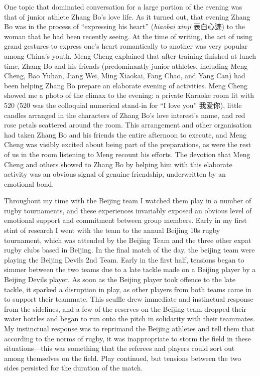 \begin{CJK}{UTF8}{gbsn}
One topic that dominated conversation for a large portion of the evening was that of junior athlete Zhang Bo's love life.  As it turned out, that evening Zhang Bo was in the process of ``expressing his heart'' (\textit{biaobai xinji} 表白心迹) to the woman that he had been recently seeing.  At the time of writing, the act of using grand gestures to express one's heart romantically to another was very popular among China's youth.  Meng Cheng explained that after training finished at lunch time, Zhang Bo and his friends (predominantly junior athletes, including Meng Cheng, Bao Yuhan, Jiang Wei, Ming Xiaokai, Fang Chao, and Yang Can) had been helping Zhang Bo prepare an elaborate evening of activities.  Meng Cheng showed me a photo of the climax to the evening: a private Karaoke room lit with 520 (520 was the colloquial numerical stand-in for ``I love you'' 我爱你), little candles arranged in the characters of Zhang Bo's love interest's name, and red rose petals scattered around the room.  This arrangement and other organisation had taken Zhang Bo and his friends the entire afternoon to execute, and Meng Cheng was visibly excited about being part of the preparations, as were the rest of us in the room listening to Meng recount his efforts.   The devotion that Meng Cheng and others showed to Zhang Bo by helping him with this elaborate activity was an obvious signal of genuine friendship, underwritten by an emotional bond.

Throughout my time with the Beijing team I watched them play in a number of rugby tournaments, and these experiences invariably exposed an obvious level of emotional support and commitment between group members.  Early in my first stint of research I went with the team to the annual Beijing 10s rugby tournament, which was attended by the Beijing Team and the three other expat rugby clubs based in Beijing.  In the final match of the day, the beijing team were playing the Beijing Devils 2nd Team.  Early in the first half, tensions began to simmer between the two teams due to a late tackle made on a Beijing player by a Beijing Devils player.  As soon as the Beijing player took offence to the late tackle, it sparked a disruption in play, as other players from both teams came in to support their teammate.  This scuffle drew immediate and instinctual response from the sidelines, and a few of the reserves on the Beijing team dropped their water bottles and began to run onto the pitch in solidarity with their teammates.  My instinctual response was to reprimand the Beijing athletes and tell them that according to the norms of rugby, it was inappropriate to storm the field in these situations---this was something that the referees and players could sort out among themselves on the field.  Play continued, but tensions between the two sides persisted for the duration of the match.


\end{CJK}
